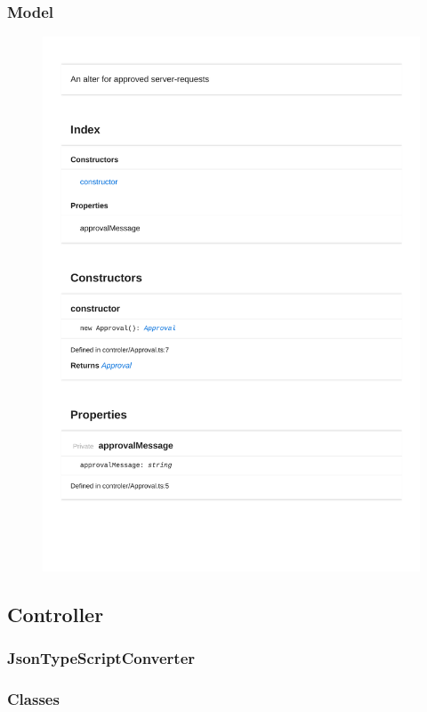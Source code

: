 \subsubsection{Model}
\begin{figure}[H]
\centerline{\includegraphics[width=\textwidth]{FrontendDocsAsPDF/Model/Approval.pdf}}
\end{figure}

\subsection{Controller}

\subsubsection{JsonTypeScriptConverter}

\subsubsection{Classes}